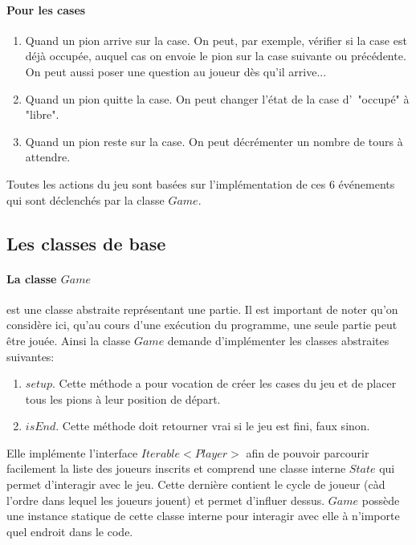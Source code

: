 \documentclass{article}
\begin{document}
\paragraph{Pour les cases}
\begin{enumerate}
\item Quand un pion arrive sur la case. On peut, par exemple, vérifier si la case est déjà occupée, auquel cas on envoie le pion sur la case suivante ou précédente. On peut aussi poser une question au joueur dès qu'il arrive...
\item Quand un pion quitte la case. On peut changer l'état de la case d'~"occupé" à "libre".
\item Quand un pion reste sur la case. On peut décrémenter un nombre de tours à attendre.
\end{enumerate}

Toutes les actions du jeu sont basées sur l'implémentation de ces 6 événements qui sont déclenchés par la classe $Game$.

\subsection{Les classes de base}

\paragraph{La classe $Game$} est une classe abstraite représentant une partie. Il est important de noter qu'on considère ici, qu'au cours d'une exécution du programme, une seule partie peut être jouée. Ainsi la classe $Game$ demande d'implémenter les classes abstraites suivantes:

\begin{enumerate}
\item $setup$. Cette méthode a pour vocation de créer les cases du jeu et de placer tous les pions à leur position de départ.
\item $isEnd$. Cette méthode doit retourner vrai si le jeu est fini, faux sinon.
\end{enumerate}

Elle implémente l'interface $Iterable<Player>$ afin de pouvoir parcourir facilement la liste des joueurs inscrits et comprend une classe interne $State$ qui permet d'interagir avec le jeu. Cette dernière contient le cycle de joueur (càd l'ordre dans lequel les joueurs jouent) et permet d'influer dessus. $Game$ possède une instance statique de cette classe interne pour interagir avec elle à n'importe quel endroit dans le code.
\end{document}

